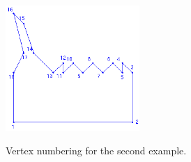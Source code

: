 \documentclass[a4paper,10pt]{amsart}
\begin{document}
\begin{figure}
\centering
\includegraphics[width=2in]{figs-otherdomains/wigglytop-numbered.png} \\
\caption{Vertex numbering for the second example.}
\label{wigglytop-numbered}
\end{figure}
\end{document}
